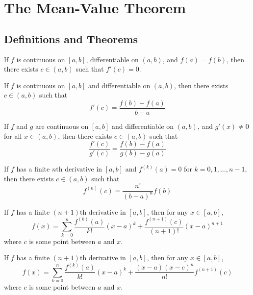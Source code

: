 \section{The Mean-Value Theorem}

\subsection*{Definitions and Theorems}

\begin{theorem}
If $f$ is continuous on $[a,b]$, differentiable on $(a,b)$, and $f(a) = f(b)$, then there exists $c \in (a,b)$ such that $f'(c) = 0$.
\end{theorem}

\begin{theorem}
If $f$ is continuous on $[a,b]$ and differentiable on $(a,b)$, then there exists $c \in (a,b)$ such that
\[ f'(c) = \frac{f(b) - f(a)}{b - a} \]
\end{theorem}

\begin{theorem}
If $f$ and $g$ are continuous on $[a,b]$ and differentiable on $(a,b)$, and $g'(x) \neq 0$ for all $x \in (a,b)$, then there exists $c \in (a,b)$ such that
\[ \frac{f'(c)}{g'(c)} = \frac{f(b) - f(a)}{g(b) - g(a)} \]
\end{theorem}

\begin{theorem}
If $f$ has a finite $n$th derivative in $[a,b]$ and $f^{(k)}(a) = 0$ for $k = 0, 1, \ldots, n-1$, then there exists $c \in (a,b)$ such that
\[ f^{(n)}(c) = \frac{n!}{(b-a)^n} f(b) \]
\end{theorem}

\begin{theorem}
If $f$ has a finite $(n+1)$th derivative in $[a,b]$, then for any $x \in [a,b]$,
\[ f(x) = \sum_{k=0}^{n} \frac{f^{(k)}(a)}{k!} (x-a)^k + \frac{f^{(n+1)}(c)}{(n+1)!} (x-a)^{n+1} \]
where $c$ is some point between $a$ and $x$.
\end{theorem}

\begin{theorem}
If $f$ has a finite $(n+1)$th derivative in $[a,b]$, then for any $x \in [a,b]$,
\[ f(x) = \sum_{k=0}^{n} \frac{f^{(k)}(a)}{k!} (x-a)^k + \frac{(x-a)(x-c)^n}{n!} f^{(n+1)}(c) \]
where $c$ is some point between $a$ and $x$.
\end{theorem}

